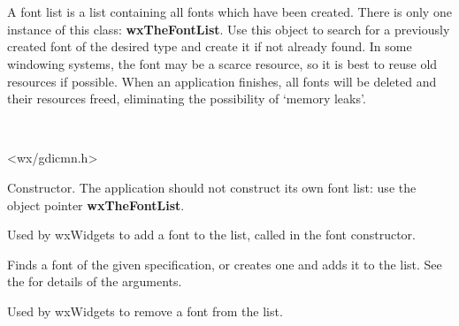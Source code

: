 \section{}\label{wxfontlist}

A font list is a list containing all fonts which have been created. There
is only one instance of this class: {\bf wxTheFontList}.  Use this object to search
for a previously created font of the desired type and create it if not already found.
In some windowing systems, the font may be a scarce resource, so it is best to
reuse old resources if possible.  When an application finishes, all fonts will be
deleted and their resources freed, eliminating the possibility of `memory leaks'.


\\


<wx/gdicmn.h>




\label{wxfontlistctor}


Constructor. The application should not construct its own font list:
use the object pointer {\bf wxTheFontList}.

\label{wxfontlistaddfont}


Used by wxWidgets to add a font to the list, called in the font constructor.

\label{findorcreatefont}


Finds a font of the given specification, or creates one and adds it to the list. See the  for
details of the arguments.

\label{wxfontlistremovefont}


Used by wxWidgets to remove a font from the list.


